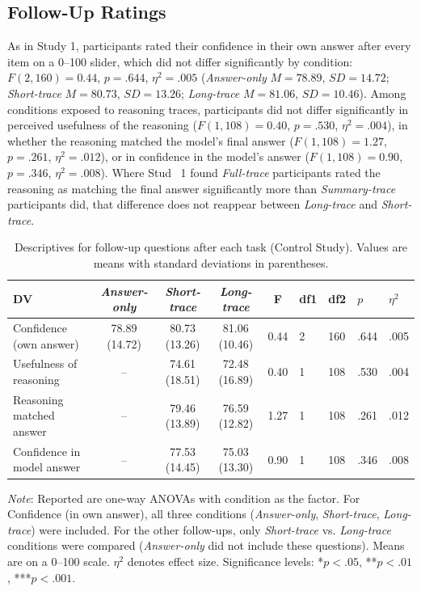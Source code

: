 \documentclass[manuscript,review,anonymous]{acmart}
\begin{document}
\subsection{Follow-Up Ratings}
As in Study 1, participants rated their confidence in their own answer after
every item on a 0--100 slider, which did not differ significantly by
condition: $F(2, 160) = 0.44$, $p = .644$, $\eta^2 = .005$
(\textit{Answer-only} $M = 78.89$, $SD = 14.72$; \textit{Short-trace} $M =
80.73$, $SD = 13.26$; \textit{Long-trace} $M = 81.06$, $SD = 10.46$). Among
conditions exposed to reasoning traces, participants did not differ
significantly in perceived usefulness of the reasoning ($F(1,108) = 0.40$, $p =
.530$, $\eta^2 = .004$), in whether the reasoning matched the model's final
answer ($F(1,108) = 1.27$, $p = .261$, $\eta^2 = .012$), or in confidence in the
model's answer ($F(1,108) = 0.90$, $p = .346$, $\eta^2 = .008$). Where Stud ~1
found \textit{Full-trace} participants rated the reasoning as matching the final
answer significantly more than \textit{Summary-trace} participants did, that
difference does not reappear between \textit{Long-trace} and
\textit{Short-trace}.

\begin{table}[!htp]
\centering
\caption{Descriptives for follow-up questions after each task (Control Study). Values
are means with standard deviations in parentheses.}
\label{tab:study2_followup}
\begin{tabular}{lccccllll}
\hline
DV & \textit{Answer-only} & \textit{Short-trace} & \textit{Long-trace} & F & df1 & df2 & $p$ & $\eta^2$ \\ \hline
Confidence (own answer)   & 78.89 (14.72) & 80.73 (13.26) & 81.06 (10.46) & 0.44 & 2 & 160 & .644 & .005 \\
Usefulness of reasoning   & -- & 74.61 (18.51) & 72.48 (16.89) & 0.40 & 1 & 108 & .530 & .004 \\
Reasoning matched answer  & -- & 79.46 (13.89) & 76.59 (12.82) & 1.27 & 1 & 108 & .261 & .012 \\
Confidence in model answer & -- & 77.53 (14.45) & 75.03 (13.30) & 0.90 & 1 & 108 & .346 & .008 \\
\hline
\end{tabular}

\raggedright \small \textit{Note}: Reported are one-way ANOVAs with condition as
the factor. For Confidence (in own answer), all three conditions
(\textit{Answer-only}, \textit{Short-trace}, \textit{Long-trace}) were included.
For the other follow-ups, only \textit{Short-trace} vs. \textit{Long-trace}
conditions were compared (\textit{Answer-only} did not include these questions).
Means are on a 0--100 scale. $\eta^2$ denotes effect size. Significance levels:
*$p < .05$, **$p < .01$, ***$p < .001$.
\end{table}
\end{document}
